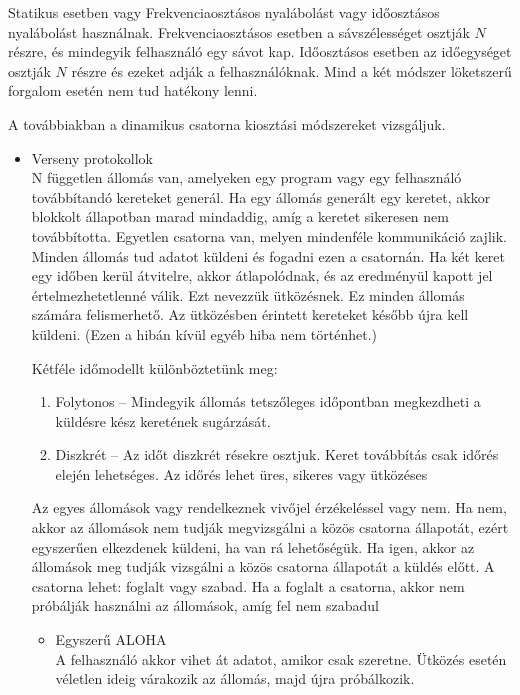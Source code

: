 \documentclass[margin=0px]{article}
\begin{document}
\begin{description}
\begin{description}
						Statikus esetben vagy Frekvenciaosztásos nyalábolást vagy időosztásos nyalábolást használnak. Frekvenciaosztásos esetben a sávszélességet osztják $N$ részre, és mindegyik felhasználó egy sávot kap. Időosztásos esetben az időegységet osztják $N$ részre és ezeket adják a felhasználóknak. Mind a két módszer löketszerű forgalom esetén nem tud hatékony lenni.
						
						A továbbiakban a dinamikus csatorna kiosztási módszereket vizsgáljuk.
						\begin{itemize}
							\item Verseny protokollok \\
								N független állomás van, amelyeken egy program vagy egy felhasználó továbbítandó kereteket generál. Ha egy állomás generált egy keretet, akkor blokkolt állapotban marad mindaddig, amíg a keretet sikeresen nem továbbította. Egyetlen csatorna van, melyen mindenféle kommunikáció zajlik. Minden állomás tud adatot küldeni és fogadni ezen a csatornán. Ha két keret egy időben kerül átvitelre, akkor átlapolódnak, és az eredményül kapott jel értelmezhetetlenné válik. Ezt nevezzük ütközésnek. Ez minden állomás számára felismerhető. Az ütközésben érintett kereteket később újra kell küldeni. (Ezen a hibán kívül egyéb hiba nem történhet.)
								
								Kétféle időmodellt különböztetünk meg:
								\begin{enumerate}
									\item Folytonos – Mindegyik állomás tetszőleges időpontban megkezdheti a küldésre kész keretének sugárzását.
									\item Diszkrét – Az időt diszkrét résekre osztjuk. Keret továbbítás csak időrés elején lehetséges. Az időrés lehet üres, sikeres vagy ütközéses
								\end{enumerate}
								
								Az egyes állomások vagy rendelkeznek vivőjel érzékeléssel vagy nem. Ha nem, akkor az állomások nem tudják megvizsgálni a közös csatorna állapotát, ezért egyszerűen elkezdenek küldeni, ha van rá lehetőségük. Ha igen, akkor az állomások meg tudják vizsgálni a közös csatorna állapotát a küldés előtt. A csatorna lehet: foglalt vagy szabad. Ha a foglalt a csatorna, akkor nem próbálják használni az állomások, amíg fel nem szabadul
								
								\begin{itemize}
									\item Egyszerű ALOHA \\
										A felhasználó akkor vihet át adatot, amikor csak szeretne. Ütközés esetén véletlen ideig várakozik az állomás, majd újra próbálkozik.
										

\end{itemize}
\end{itemize}
\end{description}
\end{description}
\end{document}
